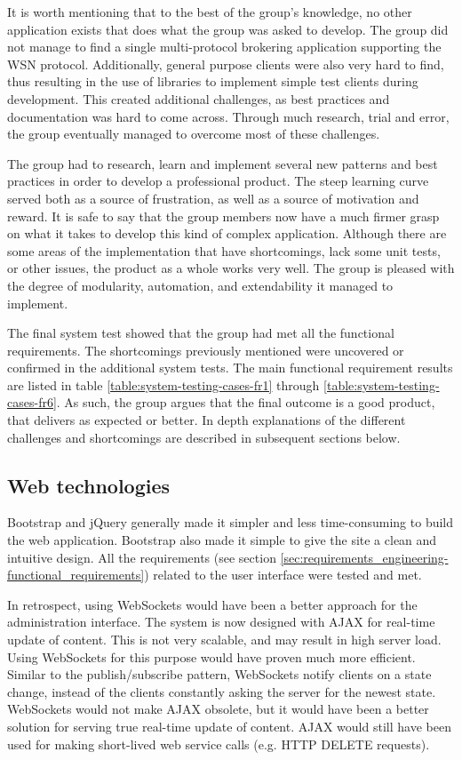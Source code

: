 It is worth mentioning that to the best of the group's knowledge, no other application exists that does what the group was asked to develop. The group did not manage to find a single multi-protocol brokering application supporting the WSN protocol. Additionally, general purpose clients were also very hard to find, thus resulting in the use of libraries to implement simple test clients during development. This created additional challenges, as best practices and documentation was hard to come across. Through much research, trial and error, the group eventually managed to overcome most of these challenges.

The group had to research, learn and implement several new patterns and best practices in order to develop a professional product. The steep learning curve served both as a source of frustration, as well as a source of motivation and reward. It is safe to say that the group members now have a much firmer grasp on what it takes to develop this kind of complex application. Although there are some areas of the implementation that have shortcomings, lack some unit tests, or other issues, the product as a whole works very well. The group is pleased with the degree of modularity, automation, and extendability it managed to implement.

The final system test showed that the group had met all the functional requirements. The shortcomings previously mentioned were uncovered or confirmed in the additional system tests. The main functional requirement results are listed in table \ref{table:system-testing-cases-fr1} through \ref{table:system-testing-cases-fr6}. As such, the group argues that the final outcome is a good product, that delivers as expected or better.
In depth explanations of the different challenges and shortcomings are described in subsequent sections below.

\subsection{Web technologies}
\label{subsec:Web_technologies}

Bootstrap and jQuery generally made it simpler and less time-consuming to build the web application. Bootstrap also made it simple to give the site a clean and intuitive design. All the requirements (see section \ref{sec:requirements_engineering-functional_requirements}) related to the user interface were tested and met.

In retrospect, using WebSockets \cite{web-sockets} would have been a better approach for the administration interface. The system is now designed with AJAX for real-time update of content. This is not very scalable, and may result in high server load. Using WebSockets for this purpose would have proven much more efficient. Similar to the publish/subscribe pattern, WebSockets notify clients on a state change, instead of the clients constantly asking the server for the newest state. WebSockets would not make AJAX obsolete, but it would have been a better solution for serving true real-time update of content. AJAX would still have been used for making short-lived web service calls (e.g. HTTP DELETE requests).

